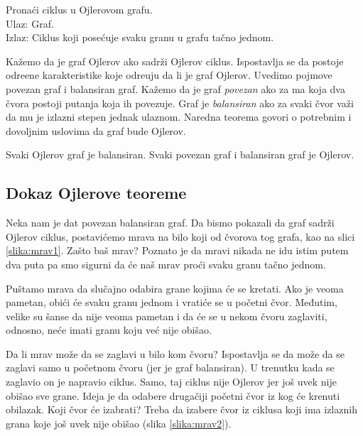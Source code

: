 \begin{problem}
	Pronaći ciklus u Ojlerovom grafu. \\
	Ulaz: Graf. \\
	Izlaz: Ciklus koji posećuje svaku granu u grafu tačno jednom.
\end{problem}

Ka\v zemo da je graf Ojlerov ako sadr\v zi Ojlerov ciklus. Ispostavlja se da postoje odre\dj ene karakteristike koje odre\dj uju da li je graf Ojlerov. Uvedimo pojmove povezan graf i balansiran graf. Kažemo da je graf \emph{povezan} ako za ma koja dva čvora postoji putanja koja ih povezuje. Graf je \emph{balansiran} ako za svaki čvor važi da mu je izlazni stepen jednak ulaznom. Naredna teorema govori o potrebnim i dovoljnim uslovima da graf bude Ojlerov.

\begin{teorema}
	Svaki Ojlerov graf je balansiran. Svaki povezan graf i balansiran graf je Ojlerov.
\end{teorema}

\subsection{Dokaz Ojlerove teoreme}

Neka nam je dat povezan balansiran graf. Da bismo pokazali da graf sadrži Ojlerov ciklus, postavićemo mrava na bilo koji od čvorova tog grafa, kao na slici \ref{slika:mrav1}. Zašto baš mrav? Poznato je da mravi nikada ne idu istim putem dva puta pa smo sigurni da će naš mrav proći svaku granu tačno jednom.

Puštamo mrava da slučajno odabira grane kojima će se kretati. Ako je veoma pametan, obići će svaku granu jednom i vratiće se u početni čvor. Međutim, velike su šanse da nije veoma pametan i da će se u nekom čvoru zaglaviti, odnosno, neće imati granu koju već nije obišao.

Da li mrav može da se zaglavi u bilo kom čvoru? Ispostavlja se da može da se zaglavi samo u početnom čvoru (jer je graf balansiran). U trenutku kada se zaglavio on je napravio ciklus. Samo, taj ciklus nije Ojlerov jer još uvek nije obišao sve grane. Ideja je da odabere drugačiji početni čvor iz kog će krenuti obilazak. Koji čvor će izabrati? Treba da izabere čvor iz ciklusa koji ima izlaznih grana koje još uvek nije obišao (slika \ref{slika:mrav2}). 

